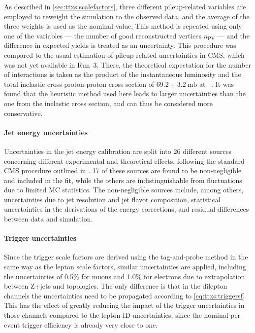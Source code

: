 As described in \cref{sec:ttxs:scalefactors}, three different pileup-related variables are employed to reweight the simulation to the observed data, and the average of the three weights is used as the nominal value. This method is repeated using only one of the variables --- the number of good reconstructed vertices $n_{\mathrm{PV}}$ --- and the difference in expected yields is treated as an uncertainty. 
This procedure was compared to the usual estimation of pileup-related uncertainties in CMS, which was not yet available in Run~3. There, the theoretical expectation for the number of interactions %
is taken as the product of the instantaneous luminosity and the total inelastic cross proton-proton cross section of $69.2 \pm \SI{3.2}{\milli\barn}$ at \sqrtsRII~\cite{CMS:LUM-17-003}. It was found that the heuristic method used here leads to
larger uncertainties than the one from the inelastic cross section, and can thus be considered more conservative.

\paragraph{Jet energy uncertainties}

Uncertainties in the jet energy calibration are split into 26 different sources concerning different experimental and theoretical effects, following the standard CMS procedure outlined in . 17 of these sources are found to be non-negligible and included in the fit, while the others are indistinguishable from fluctuations due to limited MC statistics. The non-negligible sources include, among others, uncertainties due to jet \pt resolution and jet flavor composition, statistical uncertainties in the derivations of the energy corrections, and residual differences between data and simulation.

\paragraph{Trigger uncertainties}

Since the trigger scale factors are derived using the tag-and-probe method in the same way as the lepton scale factors, similar uncertainties are applied, including the uncertainties of 0.5\% for muons and 1.0\% for electrons due to extrapolation between Z+jets and \ttbar topologies. The only difference is that in the dilepton channels the uncertainties need to be propagated according to \cref{eq:ttxs:triggersf}. This has the effect of greatly reducing the impact of the trigger uncertainties in those channels compared to the lepton ID uncertainties, since the nominal per-event trigger efficiency is already very close to one.


